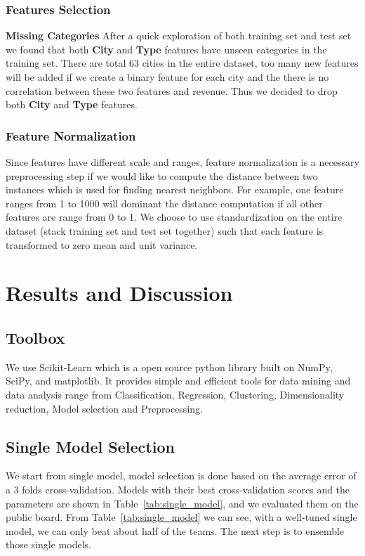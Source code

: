 \documentclass[11pt, oneside]{article}   	%
\newcommand\tabref{Table~\ref}
\begin{document}
\subsubsection{Features Selection}

{\bf Missing Categories} 
After a quick exploration of both training set and test set we found that both {\bf City} and {\bf Type} features have unseen categories in the training set.
There are total 63 cities in the entire dataset, too many new features will be added if we create a binary feature for each city and 
the there is no correlation between these two features and revenue.
Thus we decided to drop both {\bf City} and {\bf Type} features.


\subsubsection{Feature Normalization}
Since features have different scale and ranges, feature normalization is a necessary preprocessing step if we would like to compute the distance between two instances which is used for finding nearest neighbors. 
For example, one feature ranges from 1 to 1000 will dominant the distance computation if all other features are range from 0 to 1.
We choose to use standardization on the entire dataset (stack training set and test set together) such that each feature is transformed to zero mean and unit variance.

\section{Results and Discussion}

\subsection{Toolbox}
We use Scikit-Learn which is a open source python library built on NumPy, SciPy, and matplotlib. 
It provides simple and efficient tools for data mining and data analysis range from Classification, Regression, Clustering, Dimensionality reduction, Model selection and Preprocessing.

\subsection{Single Model Selection}
We start from single model, model selection is done based on the average error of a 3 folds cross-validation.
Models with their best cross-validation scores and the parameters are shown in \tabref{tab:single_model}, and we evaluated them on the public board.
From \tabref{tab:single_model} we can see, with a well-tuned single model, we can only beat about half of the teams.
The next step is to ensemble those single models.
\end{document}
